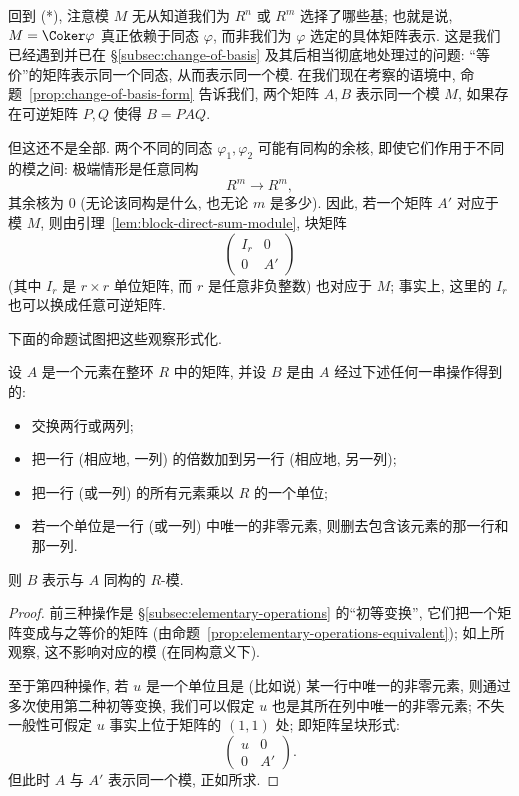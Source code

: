 回到 (*), 注意模 $M$ 无从知道我们为 $R^n$ 或 $R^m$ 选择了哪些基; 也就是说, $M=\Coker\varphi$ 真正依赖于同态 $\varphi$, 而非我们为 $\varphi$ 选定的具体矩阵表示. 这是我们已经遇到并已在 §\ref{subsec:change-of-basis} 及其后相当彻底地处理过的问题: “等价”的矩阵表示同一个同态, 从而表示同一个模. 在我们现在考察的语境中, 命题~\ref{prop:change-of-basis-form} 告诉我们, 两个矩阵 $A,B$ 表示同一个模 $M$, 如果存在可逆矩阵 $P,Q$ 使得 $B=PAQ$.

但这还不是全部. 两个不同的同态 $\varphi_1,\varphi_2$ 可能有同构的余核, 即使它们作用于不同的模之间: 极端情形是任意同构
$$
R^m \longrightarrow R^m,
$$
其余核为 $0$ (无论该同构是什么, 也无论 $m$ 是多少). 因此, 若一个矩阵 $A'$ 对应于模 $M$, 则由引理~\ref{lem:block-direct-sum-module}, 块矩阵
$$
\begin{pmatrix} I_r & 0 \\ \hline 0 & A' \end{pmatrix}
$$
(其中 $I_r$ 是 $r\times r$ 单位矩阵, 而 $r$ 是任意非负整数) 也对应于 $M$; 事实上, 这里的 $I_r$ 也可以换成任意可逆矩阵.

下面的命题试图把这些观察形式化.

\begin{proposition}\label{prop:matrix-same-module}
设 $A$ 是一个元素在整环 $R$ 中的矩阵, 并设 $B$ 是由 $A$ 经过下述任何一串操作得到的:

\begin{itemize}
\item 交换两行或两列;
\item 把一行 (相应地, 一列) 的倍数加到另一行 (相应地, 另一列);
\item 把一行 (或一列) 的所有元素乘以 $R$ 的一个单位;
\item 若一个单位是一行 (或一列) 中唯一的非零元素, 则删去包含该元素的那一行和那一列.
\end{itemize}

则 $B$ 表示与 $A$ 同构的 $R$-模.
\end{proposition}

\begin{proof}
前三种操作是 §\ref{subsec:elementary-operations} 的“初等变换”, 它们把一个矩阵变成与之等价的矩阵 (由命题~\ref{prop:elementary-operations-equivalent}); 如上所观察, 这不影响对应的模 (在同构意义下).

至于第四种操作, 若 $u$ 是一个单位且是 (比如说) 某一行中唯一的非零元素, 则通过多次使用第二种初等变换, 我们可以假定 $u$ 也是其所在列中唯一的非零元素; 不失一般性可假定 $u$ 事实上位于矩阵的 $(1,1)$ 处; 即矩阵呈块形式:
$$
\begin{pmatrix} u & 0 \\ \hline 0 & A' \end{pmatrix}.
$$
但此时 $A$ 与 $A'$ 表示同一个模, 正如所求.
\end{proof}

